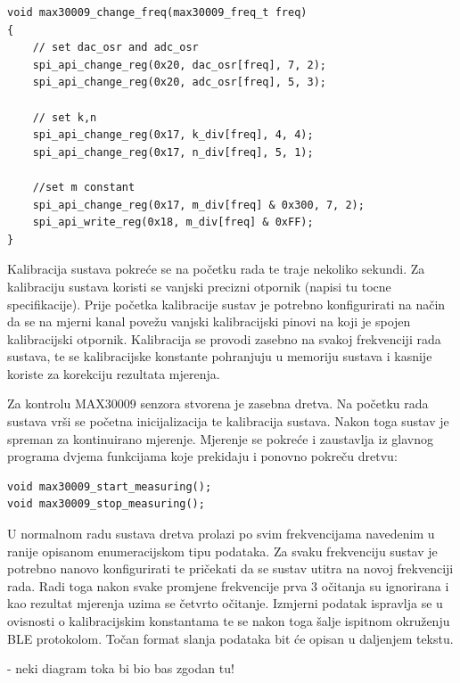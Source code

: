 \documentclass[../diplomski_rad.tex]{subfiles}
\begin{document}
\begin{lstlisting}[label={lst:promjena_frekvencije},style=CStyle,caption={Funkcija za promjenu frekvenciju sustava},captionpos=b]
void max30009_change_freq(max30009_freq_t freq)
{
    // set dac_osr and adc_osr
    spi_api_change_reg(0x20, dac_osr[freq], 7, 2);
    spi_api_change_reg(0x20, adc_osr[freq], 5, 3);

    // set k,n
    spi_api_change_reg(0x17, k_div[freq], 4, 4);
    spi_api_change_reg(0x17, n_div[freq], 5, 1);

    //set m constant
    spi_api_change_reg(0x17, m_div[freq] & 0x300, 7, 2);         
    spi_api_write_reg(0x18, m_div[freq] & 0xFF);
}
\end{lstlisting}

Kalibracija sustava pokreće se na početku rada te traje nekoliko sekundi.
Za kalibraciju sustava koristi se vanjski precizni otpornik (napisi tu tocne specifikacije). 
Prije početka kalibracije sustav je potrebno konfigurirati na način da se na mjerni kanal povežu 
vanjski kalibracijski pinovi na koji je spojen kalibracijski otpornik. 
Kalibracija se provodi zasebno na svakoj frekvenciji rada sustava, te se kalibracijske konstante pohranjuju 
u memoriju sustava i kasnije koriste za korekciju rezultata mjerenja. 

Za kontrolu MAX30009 senzora stvorena je zasebna dretva. Na početku rada sustava vrši se početna inicijalizacija te 
kalibracija sustava. Nakon toga sustav je spreman za kontinuirano mjerenje. Mjerenje se pokreće i zaustavlja iz 
glavnog programa dvjema funkcijama koje prekidaju i ponovno pokreču dretvu:
\begin{lstlisting}[label={lst:max30009_kontrola},style=CStyle,caption={Funkcije za početak i prekid mjerenja},captionpos=b]
void max30009_start_measuring();
void max30009_stop_measuring();
\end{lstlisting}
U normalnom radu sustava dretva prolazi po svim frekvencijama navedenim u ranije opisanom enumeracijskom tipu podataka. 
Za svaku frekvenciju sustav je potrebno nanovo konfigurirati te pričekati da se sustav utitra na novoj frekvenciji rada. 
Radi toga nakon svake promjene frekvencije prva 3 očitanja su ignorirana i kao rezultat mjerenja uzima se četvrto očitanje. 
Izmjerni podatak ispravlja se u ovisnosti o kalibracijskim konstantama te se nakon toga šalje ispitnom okruženju BLE protokolom. 
Točan format slanja podataka bit će opisan u daljenjem tekstu.

- neki diagram toka bi bio bas zgodan tu!
\end{document}
